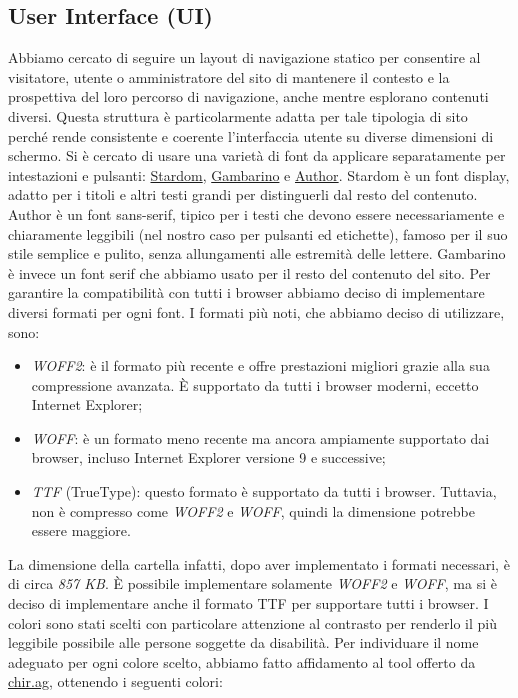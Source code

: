 \documentclass[11pt]{article}
\begin{document}
\subsection{User Interface (UI)}
\label{sec:orgc5cf3b8}
Abbiamo cercato di seguire un layout di navigazione statico per consentire al visitatore, utente o amministratore del sito di mantenere il contesto e la prospettiva del loro percorso di navigazione, anche mentre esplorano contenuti diversi. Questa struttura è particolarmente adatta per tale tipologia di sito perché rende consistente e coerente l'interfaccia utente su diverse dimensioni di schermo.
Si è cercato di usare una varietà di font da applicare separatamente per intestazioni e pulsanti: \href{https://www.fontshare.com/fonts/stardom}{Stardom}, \href{https://www.fontshare.com/fonts/gambarino}{Gambarino} e \href{https://www.fontshare.com/fonts/author}{Author}. Stardom è un font display, adatto per i titoli e altri testi grandi per distinguerli dal resto del contenuto. Author è un font sans-serif, tipico per i testi che devono essere necessariamente e chiaramente leggibili (nel nostro caso per pulsanti ed etichette), famoso per il suo stile semplice e pulito, senza allungamenti alle estremità delle lettere. Gambarino è invece un font serif che abbiamo usato per il resto del contenuto del sito. Per garantire la compatibilità con tutti i browser abbiamo deciso di implementare diversi formati per ogni font. I formati più noti, che abbiamo deciso di utilizzare, sono:
\begin{itemize}
\item \emph{WOFF2}: è il formato più recente e offre prestazioni migliori grazie alla sua compressione avanzata. È supportato da tutti i browser moderni, eccetto Internet Explorer;
\item \emph{WOFF}: è un formato meno recente ma ancora ampiamente supportato dai browser, incluso Internet Explorer versione 9 e successive;
\item \emph{TTF} (TrueType): questo formato è supportato da tutti i browser. Tuttavia, non è compresso come \emph{WOFF2} e \emph{WOFF}, quindi la dimensione potrebbe essere maggiore.
\end{itemize}
La dimensione della cartella infatti, dopo aver implementato i formati necessari, è di circa \emph{857 KB}. È possibile implementare solamente \emph{WOFF2} e \emph{WOFF}, ma si è deciso di implementare anche il formato TTF per supportare tutti i browser.
I colori sono stati scelti con particolare attenzione al contrasto per renderlo il più leggibile possibile alle persone soggette da disabilità. Per individuare il nome adeguato per ogni colore scelto, abbiamo fatto affidamento al tool offerto da \href{https://chir.ag/projects/name-that-color/\#4C4F56}{chir.ag}, ottenendo i seguenti colori:
\end{document}
